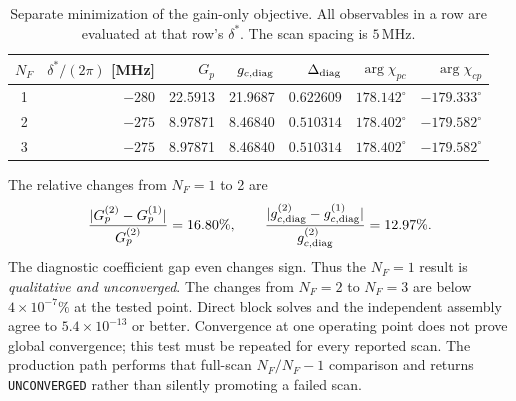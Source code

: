 \documentclass[11pt,a4paper]{article}
\newcommand{\MHz}{\,\mathrm{MHz}}
\begin{document}
\begin{table}[ht]
\centering
\caption{Separate minimization of the gain-only objective. All
observables in a row are evaluated at that row's $\delta^*$. The scan spacing
is $5\MHz$.}
\label{tab:legacy-delta-star}
\small
\begin{tabular}{c r r r r r r}
\toprule
$N_F$ & $\delta^*/(2\pi)$ [MHz] & $G_p$ & $g_{c,{\rm diag}}$ &
$\Delta_{\rm diag}$ &
$\arg\chi_{pc}$ & $\arg\chi_{cp}$\\
\midrule
1 & $-280$ & 22.5913 & 21.9687 & $0.622609$ &
$178.142^\circ$ & $-179.333^\circ$\\
2 & $-275$ & 8.97871 & 8.46840 & $0.510314$ &
$178.402^\circ$ & $-179.582^\circ$\\
3 & $-275$ & 8.97871 & 8.46840 & $0.510314$ &
$178.402^\circ$ & $-179.582^\circ$\\
\bottomrule
\end{tabular}
\end{table}

The relative changes from $N_F=1$ to 2 are
\[
\frac{|G_p^{(2)}-G_p^{(1)}|}{G_p^{(2)}}=16.80\%,
\qquad
\frac{|g_{c,{\rm diag}}^{(2)}-g_{c,{\rm diag}}^{(1)}|}
{g_{c,{\rm diag}}^{(2)}}=12.97\%.
\]
The diagnostic coefficient gap even changes sign. Thus the $N_F=1$ result is
\emph{qualitative and unconverged}. The changes from $N_F=2$ to $N_F=3$ are
below $4\times10^{-7}\%$ at the tested point. Direct block solves and the
independent assembly agree to $5.4\times10^{-13}$ or better. Convergence at
one operating point does not prove global convergence; this test must be
repeated for every reported scan. The production path performs that
full-scan $N_F/N_F-1$ comparison and returns \texttt{UNCONVERGED} rather than
silently promoting a failed scan.
\end{document}
